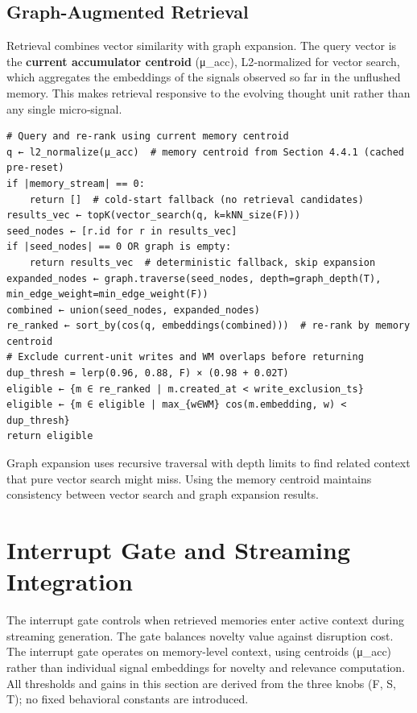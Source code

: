 \documentclass[
  letterpaper,
  DIV=11,
  numbers=noendperiod]{scrartcl}
\begin{document}
\subsection{Graph-Augmented Retrieval}\label{graph-augmented-retrieval}

Retrieval combines vector similarity with graph expansion. The query
vector is the \textbf{current accumulator centroid} (μ\_acc),
L2‑normalized for vector search, which aggregates the embeddings of the
signals observed so far in the unflushed memory. This makes retrieval
responsive to the evolving thought unit rather than any single
micro‑signal.

\begin{verbatim}
# Query and re-rank using current memory centroid
q ← l2_normalize(μ_acc)  # memory centroid from Section 4.4.1 (cached pre-reset)
if |memory_stream| == 0:
    return []  # cold-start fallback (no retrieval candidates)
results_vec ← topK(vector_search(q, k=kNN_size(F)))
seed_nodes ← [r.id for r in results_vec]
if |seed_nodes| == 0 OR graph is empty:
    return results_vec  # deterministic fallback, skip expansion
expanded_nodes ← graph.traverse(seed_nodes, depth=graph_depth(T), min_edge_weight=min_edge_weight(F))
combined ← union(seed_nodes, expanded_nodes)
re_ranked ← sort_by(cos(q, embeddings(combined)))  # re-rank by memory centroid
# Exclude current-unit writes and WM overlaps before returning
dup_thresh = lerp(0.96, 0.88, F) × (0.98 + 0.02T)
eligible ← {m ∈ re_ranked | m.created_at < write_exclusion_ts}
eligible ← {m ∈ eligible | max_{w∈WM} cos(m.embedding, w) < dup_thresh}
return eligible
\end{verbatim}

Graph expansion uses recursive traversal with depth limits to find
related context that pure vector search might miss. Using the memory
centroid maintains consistency between vector search and graph expansion
results.

\section{Interrupt Gate and Streaming Integration}\label{sec-interrupt}

The interrupt gate controls when retrieved memories enter active context
during streaming generation. The gate balances novelty value against
disruption cost. The interrupt gate operates on memory-level context,
using centroids (μ\_acc) rather than individual signal embeddings for
novelty and relevance computation. All thresholds and gains in this
section are derived from the three knobs (F, S, T); no fixed behavioral
constants are introduced.
\end{document}
